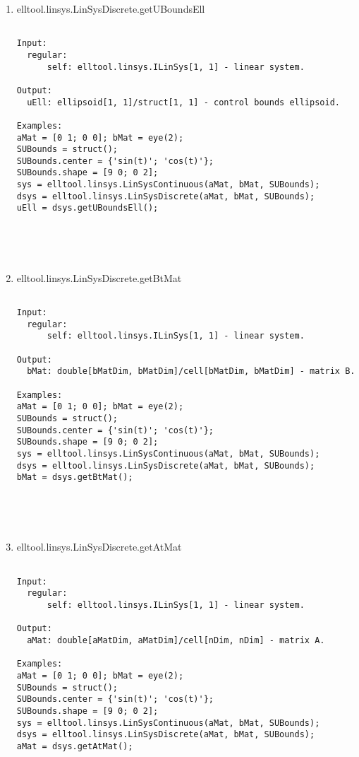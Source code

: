\begin{enumerate}
\begin{lstlisting}
\end{lstlisting}
\fontfamily{\familydefault}
\selectfont
\item {elltool.linsys.LinSysDiscrete.getUBoundsEll}
\selectfont
\begin{lstlisting}

Input:
  regular:
      self: elltool.linsys.ILinSys[1, 1] - linear system.

Output:
  uEll: ellipsoid[1, 1]/struct[1, 1] - control bounds ellipsoid.

Examples:
aMat = [0 1; 0 0]; bMat = eye(2);
SUBounds = struct();
SUBounds.center = {'sin(t)'; 'cos(t)'};
SUBounds.shape = [9 0; 0 2];
sys = elltool.linsys.LinSysContinuous(aMat, bMat, SUBounds);
dsys = elltool.linsys.LinSysDiscrete(aMat, bMat, SUBounds);
uEll = dsys.getUBoundsEll();





\end{lstlisting}
\fontfamily{\familydefault}
\selectfont
\item {elltool.linsys.LinSysDiscrete.getBtMat}
\selectfont
\begin{lstlisting}

Input:
  regular:
      self: elltool.linsys.ILinSys[1, 1] - linear system.

Output:
  bMat: double[bMatDim, bMatDim]/cell[bMatDim, bMatDim] - matrix B.

Examples:
aMat = [0 1; 0 0]; bMat = eye(2);
SUBounds = struct();
SUBounds.center = {'sin(t)'; 'cos(t)'};
SUBounds.shape = [9 0; 0 2];
sys = elltool.linsys.LinSysContinuous(aMat, bMat, SUBounds);
dsys = elltool.linsys.LinSysDiscrete(aMat, bMat, SUBounds);
bMat = dsys.getBtMat();





\end{lstlisting}
\fontfamily{\familydefault}
\selectfont
\item {elltool.linsys.LinSysDiscrete.getAtMat}
\selectfont
\begin{lstlisting}

Input:
  regular:
      self: elltool.linsys.ILinSys[1, 1] - linear system.

Output:
  aMat: double[aMatDim, aMatDim]/cell[nDim, nDim] - matrix A.

Examples:
aMat = [0 1; 0 0]; bMat = eye(2);
SUBounds = struct();
SUBounds.center = {'sin(t)'; 'cos(t)'};
SUBounds.shape = [9 0; 0 2];
sys = elltool.linsys.LinSysContinuous(aMat, bMat, SUBounds);
dsys = elltool.linsys.LinSysDiscrete(aMat, bMat, SUBounds);
aMat = dsys.getAtMat();






\end{lstlisting}
\end{enumerate}
